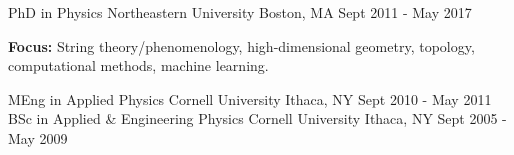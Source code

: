 

\begin{cventries}

  \cventry
    {PhD in Physics} %
    {Northeastern University} %
    {Boston, MA} %
    {Sept 2011 - May 2017} %
    {
      \begin{cvitems} %
        \item {\textbf{Focus:} String theory/phenomenology, high-dimensional geometry, topology, computational methods, machine learning.}
      \end{cvitems}
    }

  \cventry
    {MEng in Applied Physics} %
    {Cornell University} %
    {Ithaca, NY} %
    {Sept 2010 - May 2011} %
    {
    }
  \cventry
    {BSc in Applied \& Engineering Physics} %
    {Cornell University} %
    {Ithaca, NY} %
    {Sept 2005 - May 2009} %
    {
    }
\end{cventries}
